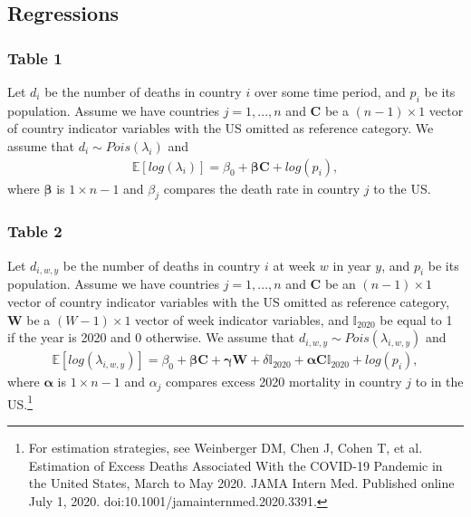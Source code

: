 \documentclass[
]{article}
\begin{document}
\hypertarget{regressions}{%
\subsection{Regressions}\label{regressions}}

\hypertarget{table-1}{%
\subsubsection{Table 1}\label{table-1}}

Let \(d_i\) be the number of deaths in country \(i\) over some time
period, and \(p_i\) be its population. Assume we have countries
\(j = 1,...,n\) and \(\mathbf{C}\) be a \((n-1) \times 1\) vector of
country indicator variables with the US omitted as reference category.
We assume that \(d_i \sim Pois(\lambda_i)\) and \begin{align}
\mathbb{E}\left[log(\lambda_i)\right] = \beta_0 +  \bm{\beta}\mathbf{C} + log(p_i),
\end{align} where \(\bm{\beta}\) is \(1 \times n-1\) and \(\beta_j\)
compares the death rate in country \(j\) to the US.

\bigskip

\hypertarget{table-2}{%
\subsubsection{Table 2}\label{table-2}}

Let \(d_{i,w,y}\) be the number of deaths in country \(i\) at week \(w\)
in year \(y\), and \(p_i\) be its population. Assume we have countries
\(j = 1,...,n\) and \(\mathbf{C}\) be an \((n-1) \times 1\) vector of
country indicator variables with the US omitted as reference category,
\(\mathbf{W}\) be a \((W-1) \times 1\) vector of week indicator
variables, and \(\mathbb{I}_{2020}\) be equal to 1 if the year is 2020
and 0 otherwise. We assume that \(d_{i,w,y} \sim Pois(\lambda_{i,w,y})\)
and \begin{align}
\mathbb{E}\left[log(\lambda_{i,w,y})\right] = \beta_0  + \bm{\beta}\mathbf{C} + \bm{\gamma}\mathbf{W} + 
\delta \mathbb{I}_{2020}  + \bm{\alpha}\mathbf{C}\mathbb{I}_{2020}  + log(p_i),
\end{align} where \(\bm{\alpha}\) is \(1 \times n-1\) and \(\alpha_j\)
compares excess 2020 mortality in country \(j\) to in the
US.\footnote{For estimation strategies, see Weinberger DM, Chen J, Cohen T, et al. Estimation of Excess Deaths Associated With the COVID-19 Pandemic in the United States, March to May 2020. JAMA Intern Med. Published online July 1, 2020. doi:10.1001/jamainternmed.2020.3391.}
\end{document}
